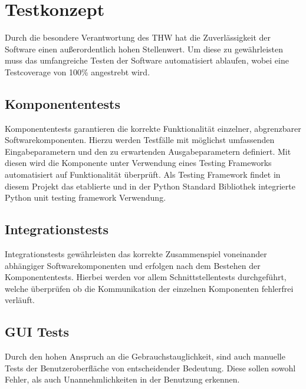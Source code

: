 \section{Testkonzept}
Durch die besondere Verantwortung des THW hat die Zuverlässigkeit der Software einen außerordentlich hohen Stellenwert. Um diese zu gewährleisten muss das umfangreiche Testen der Software automatisiert ablaufen, wobei eine Testcoverage von 100\% angestrebt wird. 
\subsection{Komponententests}
Komponententests garantieren die korrekte Funktionalität einzelner, abgrenzbarer Softwarekomponenten. Hierzu werden Testfälle mit möglichst umfassenden Eingabeparametern und den zu erwartenden Ausgabeparametern definiert. Mit diesen wird die Komponente unter Verwendung eines Testing Frameworks automatisiert auf Funktionalität überprüft. Als Testing Framework findet in diesem Projekt das etablierte und in der Python Standard Bibliothek integrierte Python unit testing framework Verwendung.
\subsection{Integrationstests} 
Integrationstests gewährleisten das korrekte Zusammenspiel voneinander abhängiger Softwarekomponenten und erfolgen nach dem Bestehen der Komponententests. Hierbei werden vor allem Schnittstellentests durchgeführt, welche überprüfen ob die Kommunikation der einzelnen Komponenten fehlerfrei verläuft.
\subsection{GUI Tests}
Durch den hohen Anspruch an die Gebrauchstauglichkeit, sind auch manuelle Tests der Benutzeroberfläche von entscheidender Bedeutung. Diese sollen sowohl Fehler, als auch Unannehmlichkeiten in der Benutzung erkennen.